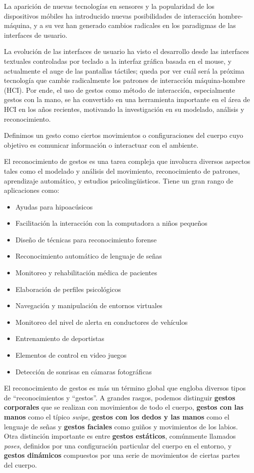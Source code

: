 
La aparición de nuevas tecnologías en sensores y la popularidad de los dispositivos móbiles ha introducido nuevas posibilidades de interacción hombre-máquina, y a su vez han generado cambios radicales en los paradigmas de las interfaces de usuario. 

La evolución de las interfaces de usuario ha visto el desarrollo desde las interfaces textuales controladas por teclado a la interfaz gráfica basada en el mouse, y actualmente el auge de las pantallas táctiles; queda por ver cuál será la próxima tecnología que cambie radicalmente los patrones de interacción máquina-hombre (HCI). Por ende, el uso de gestos como método de interacción, especialmente gestos con la mano, se ha convertido en una herramienta importante en el área de HCI en los años recientes, motivando la investigación en su modelado, análisis y reconocimiento.

Definimos un gesto como ciertos movimientos o configuraciones del cuerpo cuyo objetivo es comunicar información o interactuar con el ambiente. 

El reconocimiento de gestos es una tarea compleja que involucra diversos aspectos tales como el modelado y análisis del movimiento, reconocimiento de patrones, aprendizaje automático, y estudios psicolingüisticos. Tiene un gran rango de aplicaciones como:

\begin{itemize}
\item Ayudas para hipoacúsicos
\item Facilitación la interacción con la computadora a niños pequeños
\item Diseño de técnicas para reconocimiento forense
\item Reconocimiento automático de lenguaje de señas
\item Monitoreo y rehabilitación médica de pacientes
\item Elaboración de perfiles psicológicos
\item Navegación y manipulación de entornos virtuales
\item Monitoreo del nivel de alerta en conductores de vehículos
\item Entrenamiento de deportistas
\item Elementos de control en video juegos
\item Detección de sonrisas en cámaras fotográficas
\end{itemize}


El reconocimiento de gestos es más un término global que engloba diversos tipos de ``reconocimientos y ``gestos''. A grandes rasgos, podemos distinguir \textbf{gestos corporales} que se realizan con movimientos de todo el cuerpo, \textbf{gestos con las manos} como el típico \textit{swipe}, \textbf{gestos con los dedos y las manos} como el lenguaje de señas y \textbf{gestos faciales} como guiños y movimientos de los labios. Otra distinción importante es entre \textbf{gestos estáticos}, comúnmente llamados \textit{poses}, definidos por una configuración particular del cuerpo en el entorno, y \textbf{gestos dinámicos} compuestos por una serie de movimientos de ciertas partes del cuerpo. 

